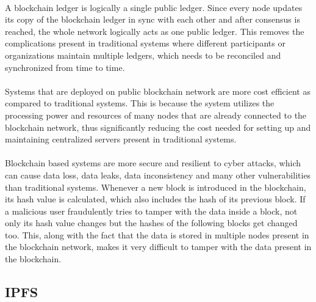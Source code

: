 \documentclass{article}
\begin{document}
        \paragraph{}
        A blockchain ledger is logically a single public ledger. Since every node updates its copy of the blockchain ledger in sync with each other and after consensus is reached, the whole network logically acts as one public ledger. This removes the complications present in traditional systems where different participants or organizations maintain multiple ledgers, which needs to be reconciled and synchronized from time to time.

        \paragraph{}
        Systems that are deployed on public blockchain network are more cost efficient as compared to traditional systems. This is because the system utilizes the processing power and resources of many nodes that are already connected to the blockchain network, thus significantly reducing the cost needed for setting up and maintaining centralized servers present in traditional systems.

        \paragraph{}
        Blockchain based systems are more secure and resilient to cyber attacks, which can cause data loss, data leaks, data inconsistency and many other vulnerabilities than traditional systems. Whenever a new block is introduced in the blockchain, its hash value is calculated, which also includes the hash of its previous block. If a malicious user fraudulently tries to tamper with the data inside a block, not only its hash value changes but the hashes of the following blocks get changed too. This, along with the fact that the data is stored in multiple nodes present in the blockchain network, makes it very difficult to tamper with the data present in the blockchain.
        
        \paragraph{}

    \subsection{IPFS}
\end{document}
